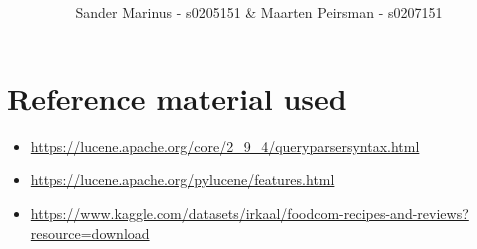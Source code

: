 \documentclass{article}
\title{\textbf{\documentTitle}}
\author{Sander Marinus - s0205151 \& Maarten Peirsman - s0207151}
\begin{document}
\maketitle

\section{Reference material used}
\begin{itemize}
    \item \url{https://lucene.apache.org/core/2_9_4/queryparsersyntax.html}
    \item \url{https://lucene.apache.org/pylucene/features.html}
    \item \url{https://www.kaggle.com/datasets/irkaal/foodcom-recipes-and-reviews?resource=download}
\end{itemize}
\end{document}
